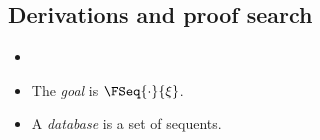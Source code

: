 





\subsection{Derivations and proof search}
\label{prop.sec.search}

\begin{definition}
  \begin{itemize}
  \item[]
  \item The \emph{goal} is $\FSeq{\cdot}{\xi}$.
  \item A \emph{database} is a set of sequents.
  \end{itemize}
\end{definition}


